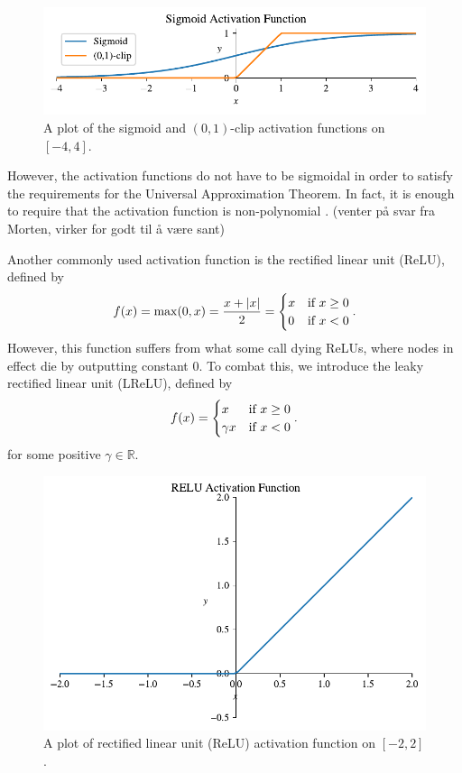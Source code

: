 \documentclass{article}
\theoremstyle{definition}
\begin{document}
\begin{figure}[ht]
    \centering
    \includegraphics[width=.7\textwidth]{activators/sigmoid.pdf}
    \caption{A plot of the sigmoid and $(0,1)$-clip activation functions on $[-4, 4]$.}
    \label{fig:sigmoid}
\end{figure}

However, the activation functions do not have to be sigmoidal in order to satisfy the requirements for the Universal Approximation Theorem. In fact, it is enough to require that the activation function is non-polynomial \cite{nonpolynomial}. (\small{venter på svar fra Morten, virker for godt til å være sant}) 

Another commonly used activation function is the rectified linear unit (ReLU), defined by
\begin{equation*}
    f(x) = \max(0, x) = \frac{x + |x|}{2} =
    \begin{cases}
        x & \textnormal{if } x \geq 0 \\
        0 & \textnormal{if } x < 0
    \end{cases}.
\end{equation*}
However, this function suffers from what some call dying ReLUs, where nodes in effect die by outputting constant $0$. To combat this, we introduce the leaky rectified linear unit (LReLU), defined by
\begin{equation*}
    f(x) =
    \begin{cases}
        x & \textnormal{if } x \geq 0 \\
        \gamma x & \textnormal{if } x < 0
    \end{cases}.
\end{equation*}
for some positive $\gamma \in \mathbb{R}$. 

\begin{figure}[ht]
    \centering
    \includegraphics[width=.7\textwidth]{activators/RELU.pdf}
    \caption{A plot of rectified linear unit (ReLU) activation function on $[-2, 2]$.}
    \label{fig:RELU}
\end{figure}
\end{document}
